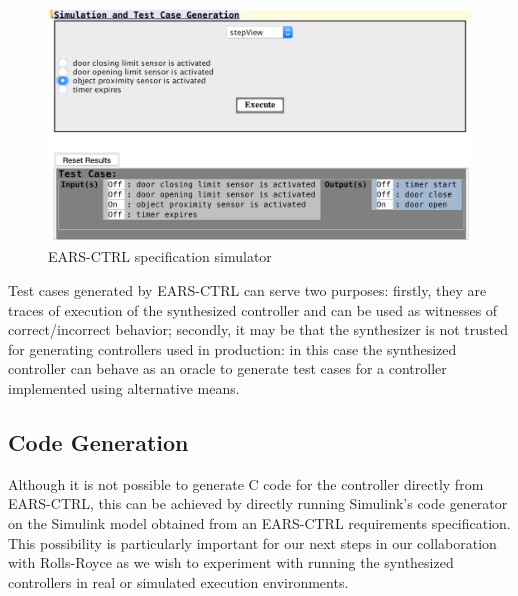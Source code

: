 \begin{figure}[h!]
   \begin{center}
     \includegraphics[width=.85\textwidth]{images/simulation.png} 
     \vspace{-.3cm}
     \caption{\textsf{EARS-CTRL} specification simulator}
     \label{fig:ears_simulator} 
   \end{center}
   \vspace{-1cm}
 \end{figure}
Test cases generated by \textsf{EARS-CTRL} can serve two purposes: firstly, they
are traces of execution of the synthesized controller and can be used as
witnesses of correct/incorrect behavior; secondly, it may be that the
synthesizer is not trusted for generating controllers used in production:
in this case the synthesized controller can behave as an oracle to generate test
cases for a controller implemented using alternative means.\vspace{-.5cm}
\subsection{Code Generation}
\vspace{-.2cm}Although it is not possible to generate C code for the controller
directly from \textsf{EARS-CTRL}, this can be achieved by directly running Simulink's code
generator on the Simulink model obtained from an \textsf{EARS-CTRL} requirements
specification. This possibility is particularly important for our next steps in
our collaboration with Rolls-Royce as we wish to experiment with running the
synthesized controllers in real or simulated execution environments.
\vspace{-.5cm}
